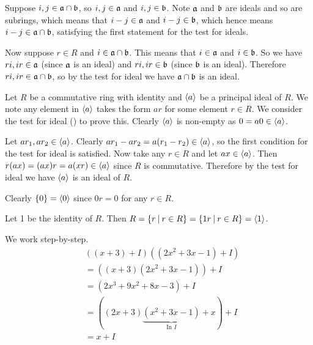 \begin{questions}
    Suppose $i,j\in\mathfrak{a}\cap\mathfrak{b}$, so $i,j \in \mathfrak{a}$ and $i,j \in \mathfrak{b}$. Note $\mathfrak{a}$ and $\mathfrak{b}$ are ideals and so are subrings, which means that $i-j \in \mathfrak{a}$ and $i-j \in \mathfrak{b}$, which hence means $i-j \in \mathfrak{a}\cap\mathfrak{b}$, satisfying the first statement for the test for ideals.

    Now suppose $r \in R$ and $i \in \mathfrak{a}\cap\mathfrak{b}$. This means that $i \in \mathfrak{a}$ and $i \in \mathfrak{b}$. So we have $ri, ir \in \mathfrak{a}$ (since $\mathfrak{a}$ is an ideal) and $ri, ir \in \mathfrak{b}$ (since $\mathfrak{b}$ is an ideal). Therefore $ri,ir \in \mathfrak{a}\cap\mathfrak{b}$, so by the test for ideal we have $\mathfrak{a}\cap\mathfrak{b}$ is an ideal.

    \item Let $R$ be a commutative ring with identity and $\left\langle a\right\rangle$ be a principal ideal of $R$. We note any element in $\left\langle a\right\rangle$ takes the form $ar$ for some element $r \in R$. We consider the test for ideal () to prove this. Clearly $\left\langle a\right\rangle$ is non-empty as $0 = a0 \in \left\langle a\right\rangle$.
    
    Let $ar_1, ar_2 \in \left\langle a\right\rangle$. Clearly $ar_1 - ar_2 = a(r_1-r_2) \in \left\langle a\right\rangle$, so the first condition for the test for ideal is satisfied. Now take any $r \in R$ and let $ax \in \left\langle a\right\rangle$. Then $r(ax) = (ax)r = a(xr) \in \left\langle a\right\rangle$ since $R$ is commutative. Therefore by the test for ideal we have $\left\langle a\right\rangle$ is an ideal of $R$.

    \item \begin{partquestions}{\alph*}
        \item Clearly $\{0\} = \left\langle0\right\rangle$ since $0r = 0$ for any $r \in R$.
        \item Let 1 be the identity of $R$. Then $R = \{r \vert r \in R\} = \{1r \vert r \in R\} = \princ{1}$.
    \end{partquestions}

    \item We work step-by-step.
    \begin{align*}
        &\left((x + 3) + I\right)\left((2x^2 + 3x - 1) + I\right)\\
        &= \left((x + 3)(2x^2+3x-1)\right) + I\\
        &= \left(2x^3 + 9x^2 + 8x - 3\right) + I\\
        &= \left((2x+3)\underbrace{(x^2+3x-1)}_{\text{In }I} + x\right) + I\\
        &= x + I
    \end{align*}


\end{questions}
